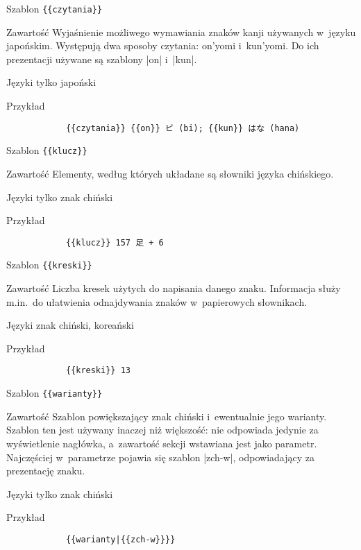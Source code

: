 \spacer %
\begin{opis}
	\item[Szablon] \verb|{{czytania}}|
	\item[Zawartość] Wyjaśnienie możliwego wymawiania znaków kanji używanych w~języku japońskim. Występują dwa sposoby czytania: on'yomi i~kun'yomi. Do ich prezentacji używane są szablony \kod|{{on}}| i~\kod|{{kun}}|.
	\item[Języki] tylko japoński
	\item[Przykład]
		\begin{verbatim}
			{{czytania}} {{on}} ビ (bi); {{kun}} はな (hana)
		\end{verbatim}
\end{opis}
\spacer
\begin{opis}
	\item[Szablon] \verb|{{klucz}}|
	\item[Zawartość] Elementy, według których układane są słowniki języka chińskiego.
	\item[Języki] tylko znak chiński
	\item[Przykład]
		\begin{verbatim}
			{{klucz}} 157 足 + 6
		\end{verbatim}
\end{opis}
\spacer
\begin{opis}
	\item[Szablon] \verb|{{kreski}}|
	\item[Zawartość] Liczba kresek użytych do napisania danego znaku. Informacja służy m.in.\ do ułatwienia odnajdywania znaków w~papierowych słownikach.
	\item[Języki] znak chiński, koreański
	\item[Przykład]
		\begin{verbatim}
			{{kreski}} 13
		\end{verbatim}
\end{opis}
\spacer
\begin{opis}
	\item[Szablon] \verb|{{warianty}}|
	\item[Zawartość] Szablon powiększający znak chiński i~ewentualnie jego warianty. Szablon ten jest używany inaczej niż większość: nie odpowiada jedynie za wyświetlenie nagłówka, a~zawartość sekcji wstawiana jest jako parametr. Najczęściej w~parametrze pojawia się szablon \kod|{{zch-w}}|, odpowiadający za prezentację znaku.
	\item[Języki] tylko znak chiński
	\item[Przykład]
		\begin{verbatim}
			{{warianty|{{zch-w}}}}
		\end{verbatim}
\end{opis}
